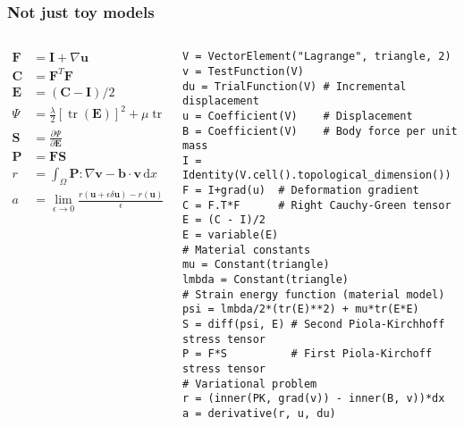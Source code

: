 \documentclass[presentation]{beamer}
\DeclareMathOperator{\tr}{tr}
\begin{document}
\begin{frame}[fragile]
  \frametitle{Not just toy models}
  \begin{columns}
    \begin{column}{0.4\textwidth}
      \begin{align*}
        \mathbf{F} &= \mathbf{I} + \nabla \mathbf{u}\\
        \mathbf{C} &= \mathbf{F}^T \mathbf{F}\\
        \mathbf{E} &= (\mathbf{C} - \mathbf{I}) / 2\\
        \Psi &= \frac{\lambda}{2}[\tr(\mathbf{E})]^2 + \mu \tr(\mathbf{E}^2)\\
        \mathbf{S} &= \frac{\partial \Psi}{\partial \mathbf{E}}\\
        \mathbf{P} &= \mathbf{F} \mathbf{S}\\
        r &= \int_\Omega \mathbf{P} : \nabla \mathbf{v} - \mathbf{b} \cdot \mathbf{v}\,\text{d}x\\
        a &= \lim_{\epsilon \to 0} \frac{r(\mathbf{u} + \epsilon \delta \mathbf{u}) - r(\mathbf{u})}{\epsilon}
      \end{align*}
    \end{column}
    \begin{column}{0.6\textwidth}
\begin{verbatim}
V = VectorElement("Lagrange", triangle, 2)
v = TestFunction(V)
du = TrialFunction(V) # Incremental displacement
u = Coefficient(V)    # Displacement
B = Coefficient(V)    # Body force per unit mass
I = Identity(V.cell().topological_dimension())
F = I+grad(u)  # Deformation gradient
C = F.T*F      # Right Cauchy-Green tensor
E = (C - I)/2
E = variable(E)
# Material constants
mu = Constant(triangle)
lmbda = Constant(triangle)
# Strain energy function (material model)
psi = lmbda/2*(tr(E)**2) + mu*tr(E*E)
S = diff(psi, E) # Second Piola-Kirchhoff stress tensor
P = F*S          # First Piola-Kirchoff stress tensor
# Variational problem
r = (inner(PK, grad(v)) - inner(B, v))*dx
a = derivative(r, u, du)
\end{verbatim}
    \end{column}
  \end{columns}
\end{frame}
\end{document}
